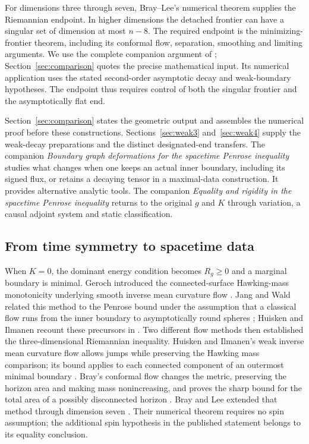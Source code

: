 For dimensions three through seven, Bray--Lee's numerical theorem
supplies the Riemannian endpoint. In higher dimensions the detached
frontier can have a singular set of dimension at most $n-8$. The required
endpoint is the minimizing-frontier theorem, including its conformal
flow, separation, smoothing and limiting arguments. We use the complete companion argument of \cite{RiemannianCompanion};
Section~\ref{sec:comparison} quotes the precise mathematical input. Its numerical application uses the stated
second-order asymptotic decay and weak-boundary hypotheses. The endpoint thus
requires control of both the singular frontier and the asymptotically
flat end.

Section~\ref{sec:comparison} states the geometric output and assembles
the numerical proof before these constructions. Sections~\ref{sec:weak3}
and~\ref{sec:weak4} supply the weak-decay preparations and the distinct
designated-end transfers.
The companion \emph{Boundary graph deformations for the spacetime
Penrose inequality} \cite{BoundaryCompanion} studies what changes when
one keeps an actual inner boundary, including its signed flux, or
retains a decaying tensor in a maximal-data construction. It provides
alternative analytic tools. The companion \emph{Equality and rigidity
in the spacetime Penrose inequality} \cite{RigidityCompanion} returns
to the original $g$ and $K$ through variation, a causal adjoint system
and static classification.

\subsection{From time symmetry to spacetime data}
When $K=0$, the dominant energy condition becomes $R_g\geq0$ and a
marginal boundary is minimal. Geroch introduced the connected-surface
Hawking-mass monotonicity underlying smooth inverse mean curvature flow
\cite{Geroch1973}. Jang and Wald related this method to the Penrose
bound under the assumption that a classical flow runs from the inner
boundary to asymptotically round spheres \cite{JangWald1977};
Huisken and Ilmanen recount these precursors in
\cite{HuiskenIlmanen2001}. Two different flow methods then
established the three-dimensional Riemannian inequality. Huisken and Ilmanen's weak
inverse mean curvature flow allows jumps while preserving the Hawking
mass comparison; its bound applies to each connected component of an
outermost minimal boundary \cite{HuiskenIlmanen2001}. Bray's conformal flow changes
the metric, preserving the horizon area and making mass nonincreasing, and proves
the sharp bound for the total area of a possibly disconnected horizon
\cite{Bray2001}. Bray and Lee extended that method through dimension seven
\cite{BrayLee2009}. Their numerical theorem requires no spin assumption;
the additional spin hypothesis in the published statement belongs to
its equality conclusion.

